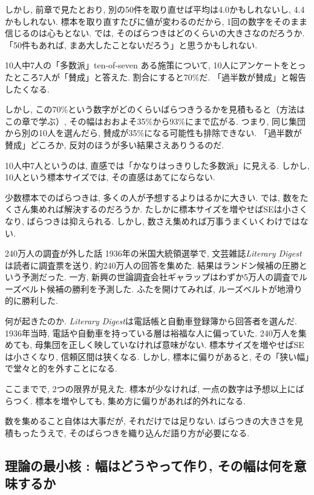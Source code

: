 しかし, 前章で見たとおり, 別の50件を取り直せば平均は4.0かもしれないし, 4.4かもしれない.
標本を取り直すたびに値が変わるのだから, 1回の数字をそのまま信じるのは心もとない.
では, そのばらつきはどのくらいの大きさなのだろうか.
「50件もあれば, まあ大したことないだろう」と思うかもしれない.

\begin{ex}{10人中7人の「多数派」}{ten-of-seven}
ある施策について, 10人にアンケートをとったところ7人が「賛成」と答えた.
割合にすると70\%だ.
「過半数が賛成」と報告したくなる.

しかし, この70\%という数字がどのくらいばらつきうるかを見積もると（方法はこの章で学ぶ）, その幅はおおよそ35\%から93\%にまで広がる.
つまり, 同じ集団から別の10人を選んだら, 賛成が35\%になる可能性も排除できない.
「過半数が賛成」どころか, 反対のほうが多い結果さえありうるのだ.

10人中7人というのは, 直感では「かなりはっきりした多数派」に見える.
しかし, 10人という標本サイズでは, その直感はあてにならない.
\end{ex}

少数標本でのばらつきは, 多くの人が予想するよりはるかに大きい.
では, 数をたくさん集めれば解決するのだろうか.
たしかに標本サイズを増やせばSEは小さくなり, ばらつきは抑えられる.
しかし, 数さえ集めれば万事うまくいくわけではない.

\begin{mybox}{240万人の調査が外した話}
1936年の米国大統領選挙で, 文芸雑誌\textit{Literary Digest}は読者に調査票を送り, 約240万人の回答を集めた.
結果はランドン候補の圧勝という予測だった.
一方, 新興の世論調査会社ギャラップはわずか5万人の調査でルーズベルト候補の勝利を予測した.
ふたを開けてみれば, ルーズベルトが地滑り的に勝利した.

何が起きたのか.
\textit{Literary Digest}は電話帳と自動車登録簿から回答者を選んだ.
1936年当時, 電話や自動車を持っている層は裕福な人に偏っていた.
240万人を集めても, 母集団を正しく映していなければ意味がない.
標本サイズを増やせばSEは小さくなり, 信頼区間は狭くなる.
しかし, 標本に偏りがあると, その「狭い幅」で堂々と的を外すことになる.
\end{mybox}

ここまでで, 2つの限界が見えた.
標本が少なければ, 一点の数字は予想以上にばらつく.
標本を増やしても, 集め方に偏りがあれば的外れになる.

数を集めること自体は大事だが, それだけでは足りない.
ばらつきの大きさを見積もったうえで, そのばらつきを織り込んだ語り方が必要になる.


\subsection{理論の最小核 : 幅はどうやって作り, その幅は何を意味するか}

